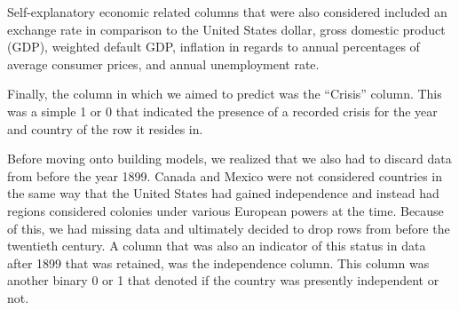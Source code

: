 \documentclass[12pt]{article}
\begin{document}
Self-explanatory economic related columns that were also considered included an exchange rate in comparison to the United States dollar, gross domestic product (GDP), weighted default GDP, inflation in regards to annual percentages of average consumer prices, and annual unemployment rate. 

Finally, the column in which we aimed to predict was the “Crisis” column. This was a simple 1 or 0 that indicated the presence of a recorded crisis for the year and country of the row it resides in.

Before moving onto building models, we realized that we also had to discard data from before the year 1899. Canada and Mexico were not considered countries in the same way that the United States had gained independence and instead had regions considered colonies under various European powers at the time. Because of this, we had missing data and ultimately decided to drop rows from before the twentieth century. A column that was also an indicator of this status in data after 1899 that was retained, was the independence column. This column was another binary 0 or 1 that denoted if the country was presently independent or not.
\end{document}
